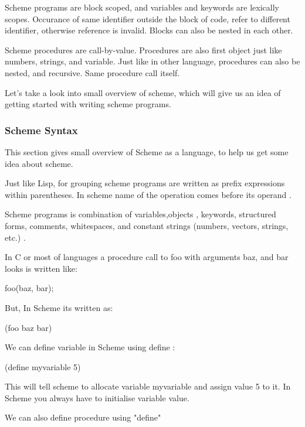 Scheme programs are block scoped, and variables and keywords are lexically scopes. Occurance of same identifier outside the block of code, refer to different identifier, otherwise reference is invalid. Blocks can also be nested in each other.

Scheme procedures are call-by-value. Procedures are also first object just like numbers, strings, and variable. Just like in other language, procedures can also be nested, and recursive. Same procedure call itself. 

Let's take a look into small overview of scheme, which will give us an idea of getting started with writing scheme programs.

\subsubsection{Scheme Syntax}

This section gives small overview of Scheme as a language, to help us get some idea about scheme.

Just like Lisp, for grouping scheme programs are written as prefix expressions within parentheses. In scheme name of the operation comes before its operand \cite{Krishnamurthi:1994:IS:197149.197166}.

Scheme programs is combination of variables,objects , keywords, structured forms, comments, whitespaces, and constant strings (numbers, vectors, strings, etc.)  \cite{SchemeLanguage}.



In C or most of languages a procedure call to foo with arguments baz, and bar looks is written like: 

\begin{center}
foo(baz, bar);
\end{center}

But, In Scheme its written as: 

\begin{center}
	(foo baz bar)
\end{center}

We can define variable in Scheme using define :

\begin{center}
	(define myvariable 5)
\end{center}

This will tell scheme to allocate variable myvariable and assign value 5 to it. In Scheme you always have to initialise variable value. 

We can also define procedure using "define"

